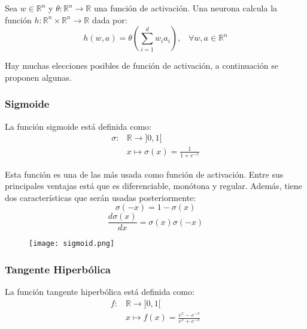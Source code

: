 \begin{definition}[Neurona]
    Sea $w\in\mathbb{R}^n$ y $\theta:\mathbb{R}^n \longrightarrow \mathbb{R}$ una función de activación. Una neurona calcula la función
    $h: \mathbb{R}^n \times \mathbb{R}^n \longrightarrow \mathbb{R}$ dada por:
    \[
        h(w, a) = \theta\left( \sum_{i=1}^d w_ia_i \right), \;\;\; \forall w, a \in \mathbb{R}^n
    \]
\end{definition}

Hay muchas elecciones posibles de función de activación, a continuación
se proponen algunas.

\subsubsection{Sigmoide}

La función sigmoide está definida como:
\begin{align*}
    \sigma \colon & \mathbb{R} \longrightarrow ]0,1[             \\
    \quad         & x \longmapsto \sigma(x) = \frac{1}{1+e^{-x}}
\end{align*}

Esta función es una de las más usada como función de activación. Entre sus principales ventajas está que es diferenciable, monótona y regular. Además, tiene dos características que serán usadas posteriormente:
\begin{equation} \label{sigmoid:1}
    \sigma(-x)=1-\sigma(x)
\end{equation}
\begin{equation} \label{sigmoid:2}
    \frac{d\sigma(x)}{dx}=\sigma(x)\sigma(-x)
\end{equation}

\begin{figure}[H]
    \texttt{[image: sigmoid.png]}
    \centering
\end{figure}

\subsubsection{Tangente Hiperbólica}

La función tangente hiperbólica está definida como:
\begin{align*}
    f \colon & \mathbb{R} \longrightarrow ]0,1[                       \\
    \quad    & x \longmapsto f(x) = \frac{e^{x}-e^{-x}}{e^{x}+e^{-x}}
\end{align*}

